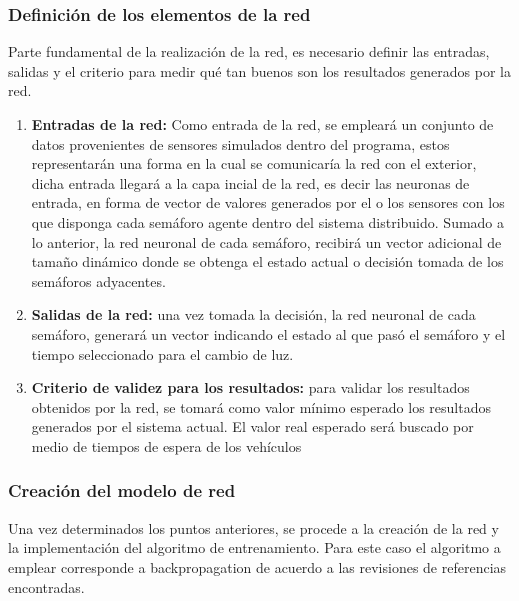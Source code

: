 \subsubsection{Definici\'{o}n de los elementos de la red}
	
		Parte fundamental de la realizaci\'{o}n de la red, es necesario definir las
	entradas, salidas y el criterio para medir qu\'{e} tan buenos son los
	resultados generados por la red.
	
	\begin{enumerate}
	  \item \textbf{Entradas de la red:} Como entrada de la red, se emplear\'{a} un
	  conjunto de datos provenientes de sensores simulados dentro del programa,
	  estos representar\'{a}n una forma en la cual se comunicar\'{i}a la red con el
	  exterior, dicha entrada llegar\'{a} a la capa incial de la red, es decir las
	  neuronas de entrada, en forma de vector de valores generados por el o los
	  sensores con los que disponga cada sem\'{a}foro agente dentro del sistema
	  distribuido. Sumado a lo anterior, la red neuronal de cada sem\'{a}foro,
	  recibir\'{a} un vector adicional de tama\~{n}o din\'{a}mico donde se obtenga el
	  estado actual o decisi\'{o}n tomada de los sem\'{a}foros adyacentes.
	  
	  \item \textbf{Salidas de la red:} una vez tomada la decisi\'{o}n, la red
	  neuronal de cada sem\'{a}foro, generar\'{a} un vector indicando el estado al
	  que pas\'{o} el sem\'{a}foro y el tiempo seleccionado para el cambio de luz.
	  
	  \item \textbf{Criterio de validez para los resultados:} para validar los
	  resultados obtenidos por la red, se tomar\'{a} como valor m\'{i}nimo esperado
	  los resultados generados por el sistema actual. El valor real esperado
	  ser\'{a} buscado por medio de tiempos de espera de los veh\'{i}culos
	  
	\end{enumerate}

\subsubsection{Creaci\'{o}n del modelo de red}

	Una vez determinados los puntos anteriores, se procede a la creaci\'{o}n de la
red y la implementaci\'{o}n del algoritmo de entrenamiento. Para este caso el
algoritmo a emplear corresponde a backpropagation de acuerdo a las revisiones de
referencias encontradas.


